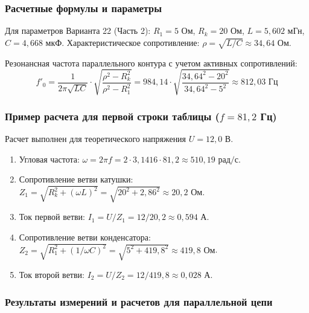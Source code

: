\documentclass[a4paper,12pt]{article}
\begin{document}
\subsubsection{Расчетные формулы и параметры}
Для параметров Варианта 22 (Часть 2): $R_1 = 5$ Ом, $R_k = 20$ Ом, $L = 5,602$ мГн, $C = 4,668$ мкФ.
Характеристическое сопротивление: $\rho = \sqrt{L/C} \approx 34,64$ Ом.

Резонансная частота параллельного контура с учетом активных сопротивлений:
$$f'_0 = \frac{1}{2\pi\sqrt{LC}} \cdot \sqrt{\frac{\rho^2 - R_k^2}{\rho^2 - R_1^2}} = 984,14 \cdot \sqrt{\frac{34,64^2 - 20^2}{34,64^2 - 5^2}} \approx 812,03 \text{ Гц}$$

\subsubsection{Пример расчета для первой строки таблицы ($f = 81,2$ Гц)}
Расчет выполнен для теоретического напряжения $U = 12,0$ В.
\begin{enumerate}
    \item Угловая частота: $\omega = 2\pi f = 2 \cdot 3,1416 \cdot 81,2 \approx 510,19 \text{ рад/с}$.
    \item Сопротивление ветви катушки: $Z_1 = \sqrt{R_k^2 + (\omega L)^2} = \sqrt{20^2 + 2,86^2} \approx 20,2 \text{ Ом}$.
    \item Ток первой ветви: $I_1 = U / Z_1 = 12 / 20,2 \approx 0,594 \text{ А}$.
    \item Сопротивление ветви конденсатора: $Z_2 = \sqrt{R_1^2 + (1/\omega C)^2} = \sqrt{5^2 + 419,8^2} \approx 419,8 \text{ Ом}$.
    \item Ток второй ветви: $I_2 = U / Z_2 = 12 / 419,8 \approx 0,028 \text{ А}$.
\end{enumerate}

\subsubsection{Результаты измерений и расчетов для параллельной цепи}
\end{document}

